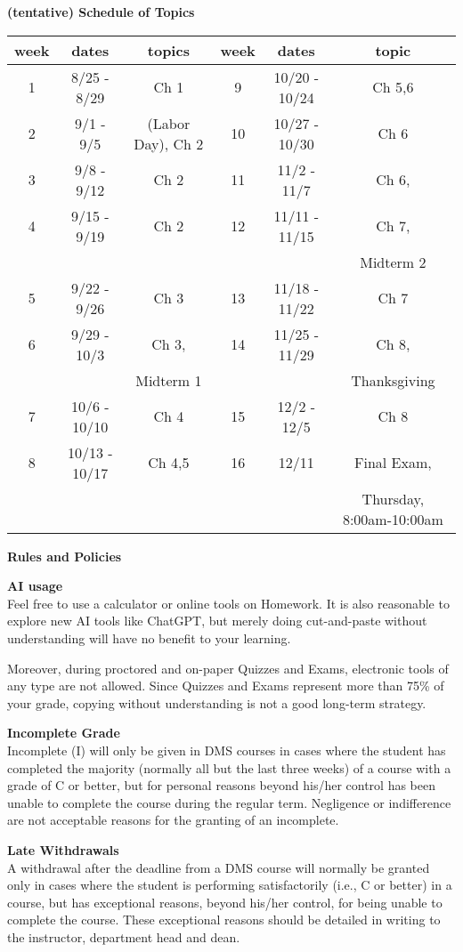 \documentclass[12pt]{article}
\renewcommand{\emph}[1]{\textsf{\textbf{#1}}}
\newcommand{\localhead}[1]{\par\smallskip\textbf{#1}\nobreak\\}%
\def\heading#1{\localhead{\large\emph{#1}}}
\def\subheading#1{\localhead{\emph{#1}}}
\begin{document}
\begin{center}
\textbf{(tentative) Schedule of Topics}\\

\begin{tabular}{c | c | c || c | c | c}
week & dates &topics& week & dates &topic\\
\hline \hline
1& 8/25 - 8/29 &Ch 1 &9& 10/20 - 10/24 &Ch 5,6 \\ \hline
2& 9/1 - 9/5&(Labor Day), Ch 2 & 10& 10/27 - 10/30& Ch 6\\ \hline
3& 9/8 - 9/12 & Ch 2 & 11& 11/2 - 11/7& Ch 6, \\ \hline
4& 9/15 - 9/19 & Ch 2 & 12& 11/11 - 11/15& Ch 7,\\ 
&&&&&Midterm 2\\ \hline
5& 9/22 - 9/26& Ch 3 & 13& 11/18 - 11/22&Ch 7 \\ \hline
6& 9/29 - 10/3& Ch 3, &14& 11/25 - 11/29&Ch 8, \\
&&Midterm 1 &&&Thanksgiving\\ \hline
7& 10/6 - 10/10& Ch 4 & 15& 12/2 - 12/5&Ch 8\\ \hline
8& 10/13 - 10/17& Ch 4,5& 16& 12/11& Final Exam, \\
&&&&&Thursday, 8:00am-10:00am\\ \hline
\end{tabular}
\end{center}

\heading{Rules and Policies}
\vskip -20pt

\subheading{AI usage}
Feel free to use a calculator or online tools on Homework.  It is also reasonable to explore new AI tools like ChatGPT, but merely doing cut-and-paste without understanding will have no benefit to your learning. 

Moreover, during proctored and on-paper Quizzes and Exams, electronic tools of any type are not allowed.  Since Quizzes and Exams represent more than 75\% of your grade, copying without understanding is not a good long-term strategy.

\subheading{Incomplete Grade} 
Incomplete (I) will only be given in
  DMS courses in cases where
  the student has completed the majority (normally all but the last
  three weeks) of a course with a grade of C or better, but for
  personal reasons beyond his/her control has been unable to complete
  the course during the regular term. Negligence or indifference are
  not acceptable reasons for the granting of an incomplete. 

\subheading{Late Withdrawals} 
A withdrawal after the deadline from a DMS course will
  normally be granted only in cases where the student is performing
  satisfactorily (i.e., C or better) in a course, but has exceptional
  reasons, beyond his/her control, for being unable to complete the
  course. These exceptional reasons should be detailed in writing to
  the instructor, department head and dean.
\end{document}
